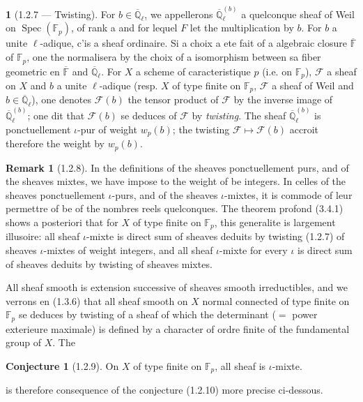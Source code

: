 \documentclass[12pt,a4paper]{article}
\theoremstyle{plain}
\theoremstyle{definition}
\newtheorem{remark}[theorem]{Remark}
\newtheorem{conjecture}[theorem]{Conjecture}
\theoremstyle{definition}
\newtheorem{para}{}[section]
\theoremstyle{remark}
\DeclareMathOperator{\Spec}{Spec}
\begin{document}
\begin{para}[1.2.7 --- Twisting]
For $b \in \overline{\mathbb{Q}}_\ell$, we appellerons $\overline{\mathbb{Q}}_\ell^{(b)}$ a quelconque sheaf of Weil on $\Spec(\mathbb{F}_p)$, of rank a and for lequel $F$ let the multiplication by $b$. For $b$ a unite $\ell$-adique, c'is a sheaf ordinaire. Si a choix a ete fait of a algebraic closure $\overline{\mathbb{F}}$ of $\mathbb{F}_p$, one the normalisera by the choix of a isomorphism between sa fiber geometric en $\overline{\mathbb{F}}$ and $\overline{\mathbb{Q}}_\ell$. For $X$ a scheme of caracteristique $p$ (i.e. on $\mathbb{F}_p$), $\mathscr{F}$ a sheaf on $X$ and $b$ a unite $\ell$-adique (resp. $X$ of type finite on $\mathbb{F}_p$, $\mathscr{F}$ a sheaf of Weil and $b \in \overline{\mathbb{Q}}_\ell$), one denotes $\mathscr{F}(b)$ the tensor product of $\mathscr{F}$ by the inverse image of $\overline{\mathbb{Q}}_\ell^{(b)}$; one dit that $\mathscr{F}(b)$ se deduces of $\mathscr{F}$ by \emph{twisting}. The sheaf $\overline{\mathbb{Q}}_\ell^{(b)}$ is ponctuellement $\iota$-pur of weight $w_p(b)$; the twisting $\mathscr{F} \mapsto \mathscr{F}(b)$ accroit therefore the weight by $w_p(b)$.
\end{para}

\begin{remark}[1.2.8]
In the definitions of the sheaves ponctuellement purs, and of the sheaves mixtes, we have impose to the weight of be integers. In celles of the sheaves ponctuellement $\iota$-purs, and of the sheaves $\iota$-mixtes, it is commode of leur permettre of be of the nombres reels quelconques. The theorem profond (3.4.1) shows a posteriori that for $X$ of type finite on $\mathbb{F}_p$, this generalite is largement illusoire: all sheaf $\iota$-mixte is direct sum of sheaves deduits by twisting (1.2.7) of sheaves $\iota$-mixtes of weight integers, and all sheaf $\iota$-mixte for every $\iota$ is direct sum of sheaves deduits by twisting of sheaves mixtes.

All sheaf smooth is extension successive of sheaves smooth irreductibles, and we verrons en (1.3.6) that all sheaf smooth on $X$ normal connected of type finite on $\mathbb{F}_p$ se deduces by twisting of a sheaf of which the determinant ($=$ power exterieure maximale) is defined by a character of ordre finite of the fundamental group of $X$. The
\end{remark}

\begin{conjecture}[1.2.9]
On $X$ of type finite on $\mathbb{F}_p$, all sheaf is $\iota$-mixte.
\end{conjecture}
is therefore consequence of the conjecture (1.2.10) more precise ci-dessous.
\end{document}
